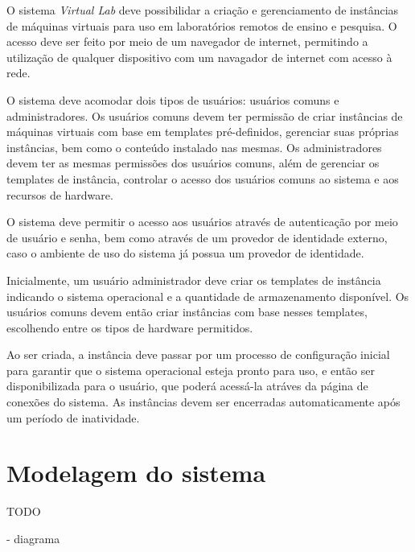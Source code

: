O sistema \textit{Virtual Lab} deve possibilidar a criação e gerenciamento de instâncias de máquinas virtuais para uso em laboratórios remotos de ensino e pesquisa.
O acesso deve ser feito por meio de um navegador de internet, permitindo a utilização de qualquer dispositivo com um navagador de internet com acesso à rede.

O sistema deve acomodar dois tipos de usuários: usuários comuns e administradores.
Os usuários comuns devem ter permissão de criar instâncias de máquinas virtuais com base em templates pré-definidos, gerenciar suas próprias instâncias, bem como o conteúdo instalado nas mesmas.
Os administradores devem ter as mesmas permissões dos usuários comuns, além de gerenciar os templates de instância, controlar o acesso dos usuários comuns ao sistema e aos recursos de hardware.

O sistema deve permitir o acesso aos usuários através de autenticação por meio de usuário e senha, bem como através de um provedor de identidade externo, caso o ambiente de uso do sistema já possua um provedor de identidade.

Inicialmente, um usuário administrador deve criar os templates de instância indicando o sistema operacional e a quantidade de armazenamento disponível.
Os usuários comuns devem então criar instâncias com base nesses templates, escolhendo entre os tipos de hardware permitidos.

Ao ser criada, a instância deve passar por um processo de configuração inicial para garantir que o sistema operacional esteja pronto para uso, e então ser disponibilizada para o usuário, que poderá acessá-la atráves da página de conexões do sistema. As instâncias devem ser encerradas automaticamente após um período de inatividade.

\section{Modelagem do sistema}
\label{sec:modelagemSistema}

TODO

- diagrama 




